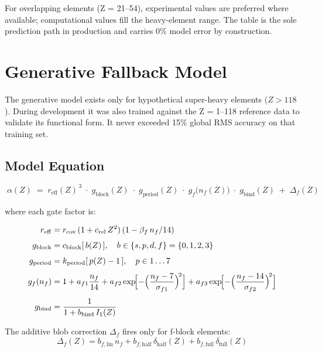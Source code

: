 \documentclass[11pt,a4paper]{article}
\begin{document}
For overlapping elements (Z = 21--54), experimental values are preferred
where available; computational values fill the heavy-element range.
The table is the sole prediction path in production and carries 0\%
model error by construction.

\section{Generative Fallback Model}

The generative model exists only for hypothetical super-heavy elements
($Z > 118$).  During development it was also trained against the
Z = 1--118 reference data to validate its functional form.
It never exceeded 15\% global RMS accuracy on that training set.

\subsection{Model Equation}

\begin{equation}
\boxed{\;
  \alpha(Z) \;=\; r_\mathrm{eff}(Z)^{\,3}\;\cdot\;
  g_\mathrm{block}(Z)\;\cdot\;
  g_\mathrm{period}(Z)\;\cdot\;
  g_f\!\bigl(n_f(Z)\bigr)\;\cdot\;
  g_\mathrm{bind}(Z)
  \;+\; \Delta_f(Z)
\;}
\label{eq:alpha}
\end{equation}

\noindent where each gate factor is:

\begin{align}
  r_\mathrm{eff} &= r_\mathrm{cov}\,(1 + c_\mathrm{rel}\,Z^2)\,(1 - \beta_f\,n_f/14)
  \label{eq:reff} \\[4pt]
  g_\mathrm{block} &= c_{\mathrm{block}}[\,b(Z)\,], \quad b \in \{s,p,d,f\}=\{0,1,2,3\}
  \\[4pt]
  g_\mathrm{period} &= k_{\mathrm{period}}[\,p(Z)-1\,], \quad p \in 1\ldots7
  \\[4pt]
  g_f(n_f) &= 1 + a_{f1}\frac{n_f}{14}
             + a_{f2}\exp\!\Bigl[-\Bigl(\frac{n_f-7}{\sigma_{f1}}\Bigr)^{\!2}\Bigr]
             + a_{f3}\exp\!\Bigl[-\Bigl(\frac{n_f-14}{\sigma_{f2}}\Bigr)^{\!2}\Bigr]
  \label{eq:gf} \\[4pt]
  g_\mathrm{bind} &= \frac{1}{1 + b_\mathrm{bind}\,I_1(Z)}
  \label{eq:gbind}
\end{align}

The additive blob correction $\Delta_f$ fires only for f-block elements:
\begin{equation}
  \Delta_f(Z) = b_{f,\mathrm{lin}}\,n_f
              + b_{f,\mathrm{half}}\,\delta_\mathrm{half}(Z)
              + b_{f,\mathrm{full}}\,\delta_\mathrm{full}(Z)
  \label{eq:blob}
\end{equation}
\end{document}
